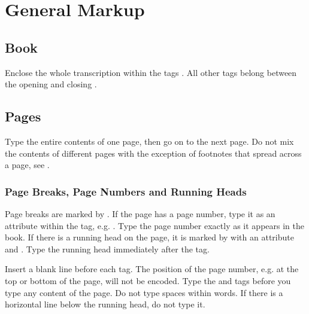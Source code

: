 \section{General Markup}

\tocspace
\subsection{Book}
\label{booklevel}
\begin{mainrule}
Enclose the whole transcription within the tags . All other tags belong between the opening  and closing .
\end{mainrule}


\subsection{Pages}

\begin{mainrule}
Type the entire contents of one page, then go on to the next page. Do not mix the contents of different pages with the exception of footnotes that spread across a page, see .
\end{mainrule}

\subsubsection{Page Breaks, Page Numbers and Running Heads}
\label{section page breaks}

\begin{mainrule}
Page breaks are marked by . If the page has a page number, type it as an attribute  within the  tag, e.g. . Type the page number exactly as it appears in the book. If there is a running head on the page, it is marked by  with an attribute  and . Type the running head immediately after the  tag.
\end{mainrule}

\begin{clarification}
Insert a blank line before each  tag.
The position of the page number, e.g. at the top or bottom of the page, will not be encoded. Type the  and  tags before you type any content of the page. Do not type spaces within words. If there is a horizontal line below the running head, do not type it.
\end{clarification}

